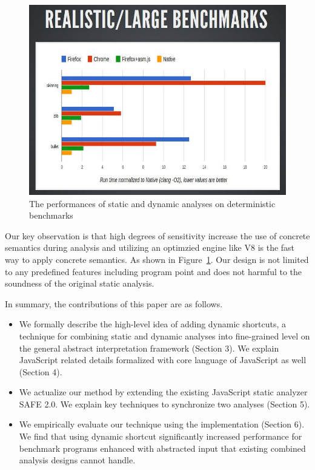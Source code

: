 \begin{figure}
  \centering
  \includegraphics[width=\linewidth]{benchmark_performance}
  \caption{The performances of static and dynamic analyses on deterministic benchmarks}
  \label{fig:performance}
\end{figure}

Our key observation is that high degrees of sensitivity increase the use of
concrete semantics during analysis and utilizing an optimzied engine like V8 is
the fast way to apply concrete semantics.
As shown in Figure~\ref{fig:performance}.
Our design is not limited to any predefined features including program point and
does not harmful to the soundness of the original static analysis.



In summary, the contributions of this paper are as follows.
\begin{itemize}
\item We formally describe the high-level idea of adding dynamic shortcuts, a
  technique for combining static and dynamic analyses into fine-grained level on
  the general abstract interpretation framework (Section 3).
  We explain JavaScript related details formalized with core language of JavaScript as well (Section 4).
\item We actualize our method by extending the existing JavaScript static analyzer SAFE 2.0.
  We explain key techniques to synchronize two analyses (Section 5).
\item We empirically evaluate our technique using the implementation (Section 6).
  We find that using dynamic shortcut significantly increased performance for
  benchmark programs enhanced with abstracted input that existing combined
  analysis designs cannot handle.
\end{itemize}

